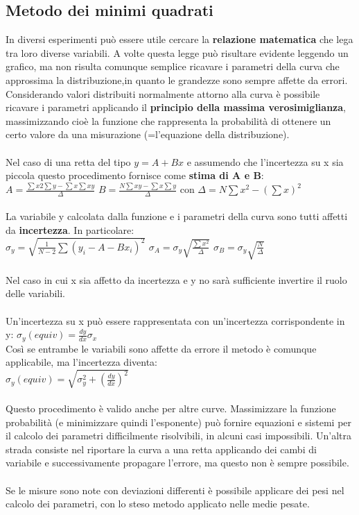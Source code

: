\documentclass{article}
\begin{document}
\subsection{Metodo dei minimi quadrati}
In diversi esperimenti può essere utile cercare la \textbf{relazione matematica} che lega tra loro diverse variabili. A volte questa legge può risultare evidente leggendo un grafico, ma non risulta comunque semplice ricavare i parametri della curva che approssima la distribuzione,in quanto le grandezze sono sempre affette da errori. Considerando valori distribuiti normalmente attorno alla curva è possibile ricavare i parametri applicando il \textbf{principio della massima verosimiglianza}, massimizzando cioè la funzione che rappresenta la probabilità di ottenere un certo valore da una misurazione (=l'equazione della distribuzione).\\\\
Nel caso di una retta del tipo $y = A + Bx$ e assumendo che l'incertezza su x sia piccola questo procedimento fornisce come \textbf{stima di A e B}: \\
$A = \frac{\sum x2 \sum y - \sum x \sum xy}{\Delta}$ \qquad $B = \frac{N\sum xy - \sum x \sum y}{\Delta}$ \qquad con $\Delta = N \sum x^2 - \left(\sum x \right)^2$\\\\
La variabile y calcolata dalla funzione e i parametri della curva sono tutti affetti da \textbf{incertezza}. In particolare: \\
$\sigma_y = \sqrt{\frac{1}{N-2} \sum (y_i - A - Bx_i)^2}$ \qquad
$\sigma_A = \sigma_y \sqrt{\frac{\sum x^2}{\Delta}}$ \qquad
$\sigma_B = \sigma_y \sqrt{\frac{N}{\Delta}}$\\\\
Nel caso in cui x sia affetto da incertezza e y no sarà sufficiente invertire il ruolo delle variabili.\\\\
Un'incertezza su x può essere rappresentata con un'incertezza corrispondente in y: $\sigma_y(equiv) = \frac{dy}{dx}\sigma_x$\\
Così se entrambe le variabili sono affette da errore il metodo è comunque applicabile, ma l'incertezza diventa:\\ $\sigma_y(equiv) = \sqrt{\sigma_y ^2 + \left(\frac{dy}{dx}\right)^2}$\\\\
Questo procedimento è valido anche per altre curve. Massimizzare la funzione probabilità (e minimizzare quindi l'esponente) può fornire equazioni e sistemi per il calcolo dei parametri difficilmente risolvibili, in alcuni casi impossibili. Un'altra strada consiste nel riportare la curva a una retta applicando dei cambi di variabile e successivamente propagare l'errore, ma questo non è sempre possibile.\\\\
Se le misure sono note con deviazioni differenti è possibile applicare dei pesi nel calcolo dei parametri, con lo steso metodo applicato nelle medie pesate.
\end{document}
